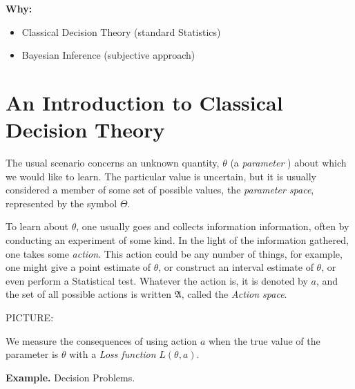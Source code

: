 \documentclass[11pt,english]{scrbook}
\begin{document}
\textbf{Why:}
\begin{itemize}
\item Classical Decision Theory (standard Statistics)
\item Bayesian Inference (subjective approach)
\end{itemize}

\section{An Introduction to Classical Decision Theory}
\label{sec:org0fa948c}

The usual scenario concerns an unknown quantity, \(\theta\) (a \emph{parameter} ) about which we would like to learn. The particular value is uncertain, but it is usually considered a member of some set of possible values, the \emph{parameter space}, represented by the symbol \(\Theta\).

To learn about \(\theta\), one usually goes and collects information information, often by conducting an experiment of some kind. In the light of the information gathered, one takes some \emph{action}. This action could be any number of things, for example, one might give a point estimate of \(\theta\), or construct an interval estimate of \(\theta\), or even perform a Statistical test. Whatever the action is, it is denoted by \(a\), and the set of all possible actions is written \(\mathfrak{A}\), called the \emph{Action space}.

PICTURE: 

\vspace{1.5in}


We measure the consequences of using action \(a\) when the true value of the parameter is \(\theta\) with a \emph{Loss function} \(L(\theta,a)\).

\textbf{Example.} Decision Problems.
\end{document}

